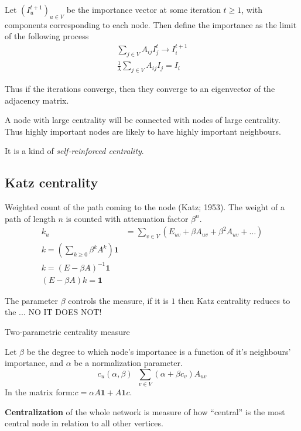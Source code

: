 \documentclass[a4paper]{article}
\newcommand{\brac}[1]{{\left ( #1 \right )}}
\newcommand{\defn}{\mathop{\overset{\Delta}{=}}\nolimits}
\begin{document}
Let $\brac{I^{t+1}_u}_{u\in V}$ be the importance vector at some iteration $t\geq1$, with components corresponding to each node. Then define the importance as the limit of the following process
\begin{align*}
	\sum_{j\in V} A_{ij} I^t_j \to I^{t+1}_i \\
	\frac{1}{\lambda}\sum_{j\in V} A_{ij} I_j = I_i
\end{align*}

Thus if the iterations converge, then they converge to an eigenvector of the adjacency matrix.

A node with large centrality will be connected with nodes of large centrality. Thus highly important nodes are likely to have highly important neighbours.

It is a kind of \emph{self-reinforced centrality}.


\subsection{Katz centrality} %
\label{sub:katz_centrality}

Weighted count of the path coming to the node (Katz; 1953). The weight of a path of length $n$ is counted with attenuation factor $\beta^n$.
\begin{align*}
	k_u &= \sum_{v\in V} \brac{E_{uv} + \beta A_{uv} + \beta^2 A_{uv} + \ldots}\\
	k = \brac{\sum_{k\geq0} \beta^k A^k} \mathbf{1} \\
	k = \brac{E - \beta A}^{-1} \mathbf{1} \\
	\brac{E - \beta A} k = \mathbf{1} 
\end{align*}

The parameter $\beta$ controls the measure, if it is $1$ then Katz centrality reduces to the ... NO IT DOES NOT!

Two-parametric centrality measure

Let $\beta$ be the degree to which node's importance is a function of it's neighbours' importance, and $\alpha$ be a normalization parameter.
\[c_u(\alpha,\beta) \defn \sum_{v\in V}\brac{\alpha+\beta c_v} A_{uv}\]
In the matrix form:$c = \alpha A\mathbf{1} + A\mathbf{1} c$.


\textbf{Centralization} of the whole network is measure of how ``central'' is the most central node in relation to all other vertices.
\end{document}
